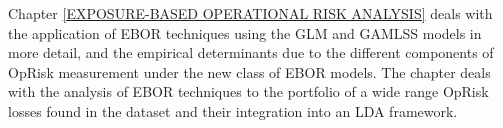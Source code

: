 \documentclass[]{article}
\begin{document}
Chapter \ref{EXPOSURE-BASED OPERATIONAL RISK ANALYSIS} deals with the
application of EBOR techniques using the GLM and GAMLSS models in more
detail, and the empirical determinants due to the different components
of OpRisk measurement under the new class of EBOR models. The chapter
deals with the analysis of EBOR techniques to the portfolio of a wide
range OpRisk losses found in the dataset and their integration into an
LDA framework.
\end{document}
